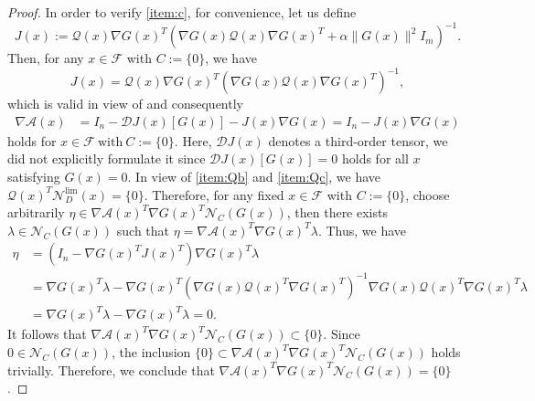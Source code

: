 \documentclass[11pt,a4paper,reqno]{amsart}
\begin{document}
{\begin{proof}
    In order to verify  \ref{item:c}, for convenience, let us define 
    \begin{equation}\label{Eq:Jx}
        J(x):= \mathcal Q(x)\nabla G(x)^T \left( \nabla G(x)\mathcal Q(x)\nabla G(x)^T+\alpha \| G(x)\|^2 I_m\right)^{-1}.
    \end{equation}
   Then, for any $x\in \mathcal F$ with $C:=\{0\}$, we have 
   \begin{equation}\label{Eq:Jx2}
   J(x) = \mathcal Q(x)\nabla G(x)^T \left( \nabla G(x)\mathcal Q(x)\nabla G(x)^T\right)^{-1},
   \end{equation}
   which is valid in view of  and consequently 
    \begin{equation}
    \begin{aligned}
    \nabla \mathcal A(x)&=I_n- \mathcal D J(x)[G(x)]-J(x)\nabla G(x)
    =I_n-J(x)\nabla G(x)  
    \end{aligned}
\end{equation}
holds for $x\in \mathcal F \ \text{with}\ C:=\{0\}$. Here, $\mathcal D J(x)$ denotes a third-order tensor, we did not explicitly formulate it since $\mathcal D J(x)[G(x)]=0$ holds for all $x$ satisfying $G(x)=0$. In view of  \ref{item:Qb} and \ref{item:Qc}, we have $\mathcal Q(x)^T \mathcal N_D^{\text{lim}}(x)=\{0\}$.
Therefore, for any fixed $x\in \mathcal F$ with $C:=\{0\}$, choose arbitrarily $\eta\in \nabla \mathcal A(x)^T \nabla G(x)^T \mathcal N_C\left( G(x)\right)$, then there exists $\lambda \in \mathcal N_C\left( G(x)\right)$ such that
$ \eta =  \nabla \mathcal A(x)^T \nabla G(x)^T \lambda$. Thus, we have
\begin{equation*}
    \begin{aligned}
        \eta&=\left(I_n-\nabla G(x)^TJ(x)^T \right)\nabla G(x)^T \lambda\\
        &=\nabla G(x)^T \lambda
        -\nabla G(x)^T \left(\nabla G(x)\mathcal Q(x)^T \nabla G(x)^T \right)^{-1}\nabla G(x) \mathcal Q(x)^T\nabla G(x)^T\lambda\\
        & = \nabla G(x)^T \lambda -\nabla G(x)^T \lambda =0.
    \end{aligned}
\end{equation*}
It follows that $\nabla \mathcal A(x)^T \nabla G(x)^T \mathcal N_C\left( G(x)\right) \subset \{0\}$.
Since $0\in \mathcal N_C\left( G(x)\right)$, the inclusion
$\{0\} \subset \nabla \mathcal A(x)^T \nabla G(x)^T \mathcal N_C\left( G(x)\right)$
holds trivially. Therefore, we conclude that $\nabla \mathcal A(x)^T \nabla G(x)^T \mathcal N_C\left( G(x)\right)=\{0\}$.


\end{proof}}
\end{document}
